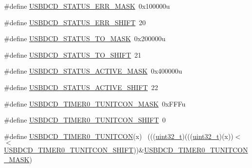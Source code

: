 \begin{DoxyCompactItemize}
\item 
\#define \hyperlink{group___u_s_b_d_c_d___register___masks_gaa0a0297c32e8af91d40e8cba8ffe8d1e}{U\+S\+B\+D\+C\+D\+\_\+\+S\+T\+A\+T\+U\+S\+\_\+\+E\+R\+R\+\_\+\+M\+A\+SK}~0x100000u
\item 
\#define \hyperlink{group___u_s_b_d_c_d___register___masks_gac82e47386e1af144b9e4d579bacfca50}{U\+S\+B\+D\+C\+D\+\_\+\+S\+T\+A\+T\+U\+S\+\_\+\+E\+R\+R\+\_\+\+S\+H\+I\+FT}~20
\item 
\#define \hyperlink{group___u_s_b_d_c_d___register___masks_ga69616f9e6fd32921dee0543a3cfde633}{U\+S\+B\+D\+C\+D\+\_\+\+S\+T\+A\+T\+U\+S\+\_\+\+T\+O\+\_\+\+M\+A\+SK}~0x200000u
\item 
\#define \hyperlink{group___u_s_b_d_c_d___register___masks_ga2b59871476643f7c428868c6ebbcef5a}{U\+S\+B\+D\+C\+D\+\_\+\+S\+T\+A\+T\+U\+S\+\_\+\+T\+O\+\_\+\+S\+H\+I\+FT}~21
\item 
\#define \hyperlink{group___u_s_b_d_c_d___register___masks_ga6127ac2a4e36e01dfe2c939203f8a72f}{U\+S\+B\+D\+C\+D\+\_\+\+S\+T\+A\+T\+U\+S\+\_\+\+A\+C\+T\+I\+V\+E\+\_\+\+M\+A\+SK}~0x400000u
\item 
\#define \hyperlink{group___u_s_b_d_c_d___register___masks_ga77f2a6e381b526f9d70e13cdf21332a5}{U\+S\+B\+D\+C\+D\+\_\+\+S\+T\+A\+T\+U\+S\+\_\+\+A\+C\+T\+I\+V\+E\+\_\+\+S\+H\+I\+FT}~22
\item 
\#define \hyperlink{group___u_s_b_d_c_d___register___masks_ga21cf0206b969eecd876b5b612ca33f9e}{U\+S\+B\+D\+C\+D\+\_\+\+T\+I\+M\+E\+R0\+\_\+\+T\+U\+N\+I\+T\+C\+O\+N\+\_\+\+M\+A\+SK}~0x\+F\+F\+Fu
\item 
\#define \hyperlink{group___u_s_b_d_c_d___register___masks_ga4a35e4b1c280e2a888b8505ab2009370}{U\+S\+B\+D\+C\+D\+\_\+\+T\+I\+M\+E\+R0\+\_\+\+T\+U\+N\+I\+T\+C\+O\+N\+\_\+\+S\+H\+I\+FT}~0
\item 
\#define \hyperlink{group___u_s_b_d_c_d___register___masks_ga29c0ca2905f7731731856f8c22343dfe}{U\+S\+B\+D\+C\+D\+\_\+\+T\+I\+M\+E\+R0\+\_\+\+T\+U\+N\+I\+T\+C\+ON}(x)                            ~(((\hyperlink{_p_e___types_8h_a33594304e786b158f3fb30289278f5af}{uint32\+\_\+t})(((\hyperlink{_p_e___types_8h_a33594304e786b158f3fb30289278f5af}{uint32\+\_\+t})(x))$<$$<$\hyperlink{group___u_s_b_d_c_d___register___masks_ga4a35e4b1c280e2a888b8505ab2009370}{U\+S\+B\+D\+C\+D\+\_\+\+T\+I\+M\+E\+R0\+\_\+\+T\+U\+N\+I\+T\+C\+O\+N\+\_\+\+S\+H\+I\+FT}))\&\hyperlink{group___u_s_b_d_c_d___register___masks_ga21cf0206b969eecd876b5b612ca33f9e}{U\+S\+B\+D\+C\+D\+\_\+\+T\+I\+M\+E\+R0\+\_\+\+T\+U\+N\+I\+T\+C\+O\+N\+\_\+\+M\+A\+SK})
\item 
$$
\end{DoxyCompactItemize}
